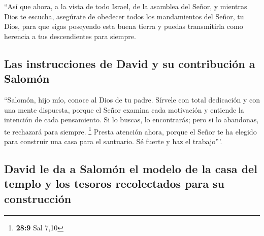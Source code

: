  ``Así que ahora, a la vista de todo Israel, de la
asamblea del Señor, y mientras Dios te escucha, asegúrate de obedecer
todos los mandamientos del Señor, tu Dios, para que sigas poseyendo esta
buena tierra y puedas transmitirla como herencia a tus descendientes
para siempre.

\hypertarget{las-instrucciones-de-david-y-su-contribuciuxf3n-a-salomuxf3n}{%
\subsection{Las instrucciones de David y su contribución a
Salomón}\label{las-instrucciones-de-david-y-su-contribuciuxf3n-a-salomuxf3n}}

 ``Salomón, hijo mío, conoce al Dios de tu padre. Sírvele
con total dedicación y con una mente dispuesta, porque el Señor examina
cada motivación y entiende la intención de cada pensamiento. Si lo
buscas, lo encontrarás; pero si lo abandonas, te rechazará para siempre.
\footnote{\textbf{28:9} Sal 7,10}  Presta atención ahora,
porque el Señor te ha elegido para construir una casa para el santuario.
Sé fuerte y haz el trabajo'''.

\hypertarget{david-le-da-a-salomuxf3n-el-modelo-de-la-casa-del-templo-y-los-tesoros-recolectados-para-su-construcciuxf3n}{%
\subsection{David le da a Salomón el modelo de la casa del templo y los
tesoros recolectados para su
construcción}\label{david-le-da-a-salomuxf3n-el-modelo-de-la-casa-del-templo-y-los-tesoros-recolectados-para-su-construcciuxf3n}}


